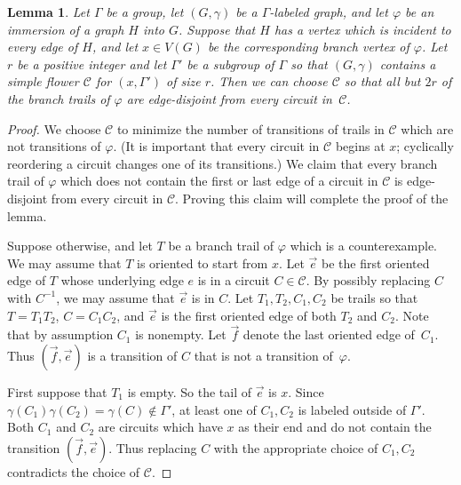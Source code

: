 \documentclass[11pt]{article}
\newtheorem{lemma}[thm]{Lemma}
\theoremstyle{definition}
\newcommand{\C}{\mathcal{C}}
\begin{document}
\begin{lemma}
\label{lem:uncrossingFlower}
    Let $\Gamma$ be a group, let $(G, \gamma)$ be a $\Gamma$-labeled graph, and let $\varphi$ be an immersion of a graph $H$ into $G$. Suppose that $H$ has a vertex which is incident to every edge of $H$, and let $x \in V(G)$ be the corresponding branch vertex of $\varphi$. Let $r$ be a positive integer and let $\Gamma'$ be a subgroup of $\Gamma$ so that $(G, \gamma)$ contains a simple flower $\C$ for $(x, \Gamma')$ of size $r$. Then we can choose $\C$ so that all but $2r$ of the branch trails of $\varphi$ are edge-disjoint from every circuit in~$\C$.
\end{lemma}
\begin{proof}
    We choose $\C$ to minimize the number of transitions of trails in $\C$ which are not transitions of $\varphi$. (It is important that every circuit in $\C$ begins at $x$; cyclically reordering a circuit changes one of its transitions.) We claim that every branch trail of $\varphi$ which does not contain the first or last edge of a circuit in $\C$ is edge-disjoint from every circuit in $\C$. Proving this claim will complete the proof of the lemma.

    Suppose otherwise, and let $T$ be a branch trail of $\varphi$ which is a counterexample. We may assume that $T$ is oriented to start from $x$. Let $\vec{e}$ be the first oriented edge of $T$ whose underlying edge $e$ is in a circuit $C \in \C$. By possibly replacing $C$ with $C^{-1}$, we may assume that $\vec{e}$ is in $C$. Let $T_1, T_2, C_1, C_2$ be trails so that $T = T_1 T_2$, $C = C_1 C_2$, and $\vec{e}$ is the first oriented edge of both $T_2$ and $C_2$. Note that by assumption $C_1$ is nonempty. Let $\vec{f}$ denote the last oriented edge of~$C_1$. Thus $(\vec{f}, \vec{e})$ is a transition of $C$ that is not a transition of~$\varphi$.

    First suppose that $T_1$ is empty. So the tail of $\vec{e}$ is $x$. Since $\gamma(C_1)\gamma(C_2) = \gamma(C) \not\in \Gamma'$, at least one of $C_1, C_2$ is labeled outside of $\Gamma'$. Both $C_1$ and $C_2$ are circuits which have $x$ as their end and do not contain the transition $(\vec{f}, \vec{e})$. Thus replacing $C$ with the appropriate choice of $C_1, C_2$ contradicts the choice of $\C$. 
    
    

\end{proof}
\end{document}
